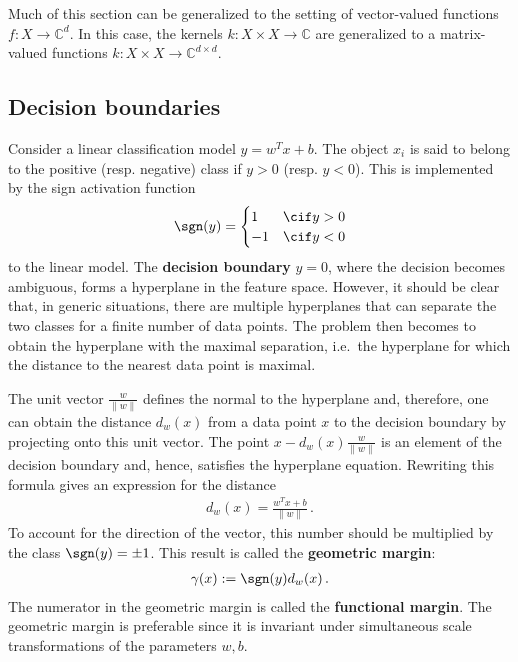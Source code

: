     \begin{remark}
        Much of this section can be generalized to the setting of vector-valued functions $f:X\rightarrow\mathbb{C}^d$. In this case, the kernels $k:X\times X\rightarrow\mathbb{C}$ are generalized to a matrix-valued functions $k:X\times X\rightarrow\mathbb{C}^{d\times d}$.
    \end{remark}

\subsection{Decision boundaries}

    Consider a linear classification model $y=w^Tx+b$. The object $x_i$ is said to belong to the positive (resp. negative) class if $y>0$ (resp. $y<0$). This is implemented by the sign activation function
    \begin{gather}
        \sgn(y) =
        \begin{cases}
            1&\cif y>0\\
            -1&\cif y<0
        \end{cases}
    \end{gather}
    to the linear model. The \textbf{decision boundary} $y=0$, where the decision becomes ambiguous, forms a hyperplane in the feature space. However, it should be clear that, in generic situations, there are multiple hyperplanes that can separate the two classes for a finite number of data points. The problem then becomes to obtain the hyperplane with the maximal separation, i.e.~the hyperplane for which the distance to the nearest data point is maximal.

    The unit vector $\frac{w}{\|w\|}$ defines the normal to the hyperplane and, therefore, one can obtain the distance $d_w(x)$ from a data point $x$ to the decision boundary by projecting onto this unit vector. The point $x-d_w(x)\frac{w}{\|w\|}$ is an element of the decision boundary and, hence, satisfies the hyperplane equation. Rewriting this formula gives an expression for the distance
    \begin{gather}
        d_w(x) = \frac{w^Tx + b}{\|w\|}\,.
    \end{gather}
    To account for the direction of the vector, this number should be multiplied by the class $\sgn(y)=\pm1$. This result is called the \textbf{geometric margin}:
    \begin{gather}
        \gamma(x):=\sgn(y)d_w(x)\,.
    \end{gather}
    The numerator in the geometric margin is called the \textbf{functional margin}. The geometric margin is preferable since it is invariant under simultaneous scale transformations of the parameters $w,b$.

